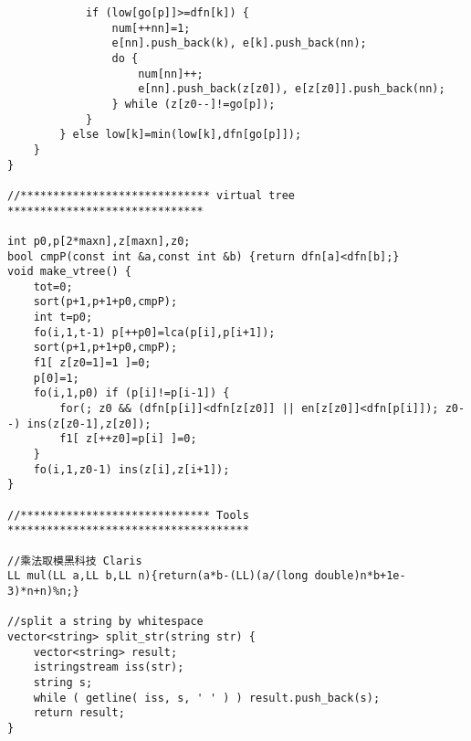 \documentclass{article}
\begin{document}
\begin{multicols}{2}
\begin{lstlisting}
            if (low[go[p]]>=dfn[k]) {
                num[++nn]=1;
                e[nn].push_back(k), e[k].push_back(nn);
                do {
                    num[nn]++;
                    e[nn].push_back(z[z0]), e[z[z0]].push_back(nn);
                } while (z[z0--]!=go[p]);
            }
        } else low[k]=min(low[k],dfn[go[p]]);
    }
}

//***************************** virtual tree ******************************

int p0,p[2*maxn],z[maxn],z0;
bool cmpP(const int &a,const int &b) {return dfn[a]<dfn[b];}
void make_vtree() {
    tot=0;
    sort(p+1,p+1+p0,cmpP);
    int t=p0;
    fo(i,1,t-1) p[++p0]=lca(p[i],p[i+1]);
    sort(p+1,p+1+p0,cmpP);
    f1[ z[z0=1]=1 ]=0;
    p[0]=1;
    fo(i,1,p0) if (p[i]!=p[i-1]) {
        for(; z0 && (dfn[p[i]]<dfn[z[z0]] || en[z[z0]]<dfn[p[i]]); z0--) ins(z[z0-1],z[z0]);
        f1[ z[++z0]=p[i] ]=0;
    }
    fo(i,1,z0-1) ins(z[i],z[i+1]);
}

//***************************** Tools *************************************

//乘法取模黑科技 Claris
LL mul(LL a,LL b,LL n){return(a*b-(LL)(a/(long double)n*b+1e-3)*n+n)%n;}

//split a string by whitespace
vector<string> split_str(string str) {
    vector<string> result;
    istringstream iss(str);
    string s;
    while ( getline( iss, s, ' ' ) ) result.push_back(s);
    return result;
}
\end{lstlisting}

\end{multicols}
\end{document}
